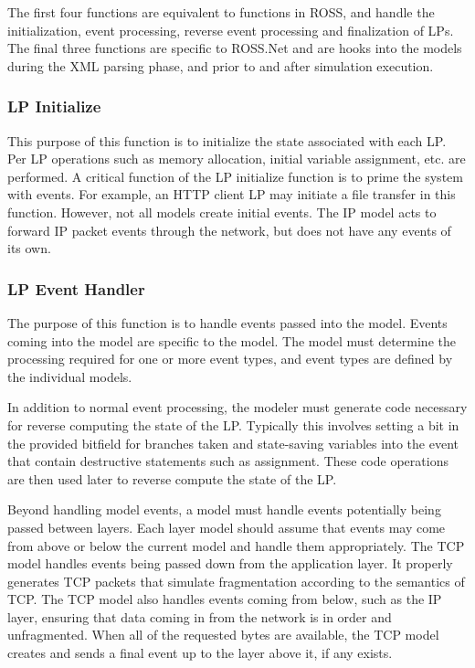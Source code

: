 \documentclass[12pt]{article}
\begin{document}
The first four functions are equivalent to functions in ROSS, and handle the
initialization, event processing, reverse event processing and finalization of
LPs.  The final three functions are specific to ROSS.Net and are hooks into
the models during the XML parsing phase, and prior to and after simulation
execution.

\subsubsection{LP Initialize}

This purpose of this function is to initialize the state associated with each
LP.  Per LP operations such as memory allocation, initial variable assignment,
etc. are performed.  A critical function of the LP initialize function is to
prime the system with events.  For example, an HTTP client LP may initiate a
file transfer in this function.  However, not all models create initial
events. The IP model acts to forward IP packet events through the network, but
does not have any events of its own.

\subsubsection{LP Event Handler}

The purpose of this function is to handle events passed into the model.
Events coming into the model are specific to the model.  The model must
determine the processing required for one or more event types, and event types
are defined by the individual models.

In addition to normal event processing, the modeler must generate code
necessary for reverse computing the state of the LP.  Typically this involves
setting a bit in the provided bitfield for branches taken and state-saving
variables into the event that contain destructive statements such as
assignment.  These code operations are then used later to reverse compute the
state of the LP.

Beyond handling model events, a model must handle events potentially being
passed between layers.  Each layer model should assume that events may come
from above or below the current model and handle them appropriately.  The TCP
model handles events being passed down from the application layer.  It
properly generates TCP packets that simulate fragmentation according to the
semantics of TCP.  The TCP model also handles events coming from below, such
as the IP layer, ensuring that data coming in from the network is in order and
unfragmented.  When all of the requested bytes are available, the TCP model
creates and sends a final event up to the layer above it, if any exists.
\end{document}
